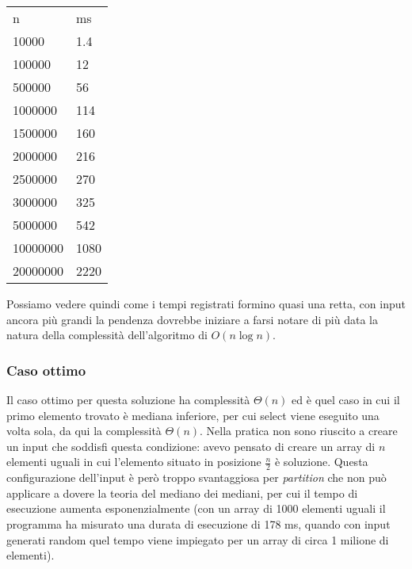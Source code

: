 \documentclass{article}
\begin{document}
\begin{center}
\begin{tabular}{ll}
n        & ms   \\
10000    & 1.4  \\
100000   & 12   \\
500000   & 56   \\
1000000  & 114  \\
1500000  & 160  \\
2000000  & 216  \\
2500000  & 270  \\
3000000  & 325  \\
5000000  & 542  \\
10000000 & 1080 \\
20000000 & 2220
\end{tabular}
\end{center}



Possiamo vedere quindi come i tempi registrati formino quasi una retta, con input ancora più grandi la pendenza dovrebbe iniziare a farsi notare di più data la natura della complessità dell'algoritmo di $O(n\log n)$.

\subsubsection{Caso ottimo}

Il caso ottimo per questa soluzione ha complessità $\Theta(n)$ ed è quel caso in cui il primo elemento trovato è mediana inferiore, per cui select viene eseguito una volta sola, da qui la complessità $\Theta(n)$. Nella pratica non sono riuscito a creare un input che soddisfi questa condizione: avevo pensato di creare un array di $n$ elementi uguali in cui l'elemento situato in posizione $\frac{n}{2}$ è soluzione. Questa configurazione dell'input è però troppo svantaggiosa per \textit{partition} che non può applicare a dovere la teoria del mediano dei mediani, per cui il tempo di esecuzione aumenta esponenzialmente (con un array di 1000 elementi uguali il programma ha misurato una durata di esecuzione di 178 ms, quando con input generati random quel tempo viene impiegato per un array di circa 1 milione di elementi). 
\end{document}

